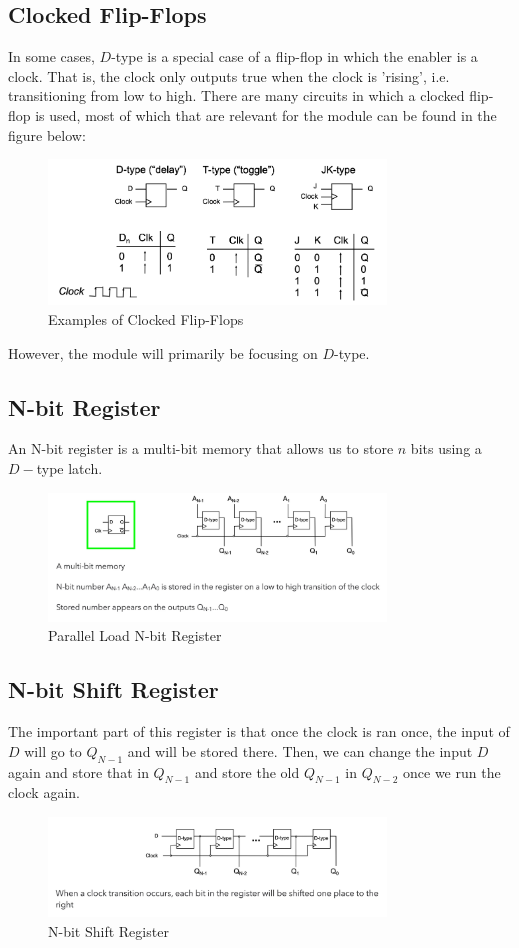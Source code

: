 \documentclass[a4paper]{article}
\theoremstyle{plain}
\theoremstyle{definition}
\theoremstyle{remark}
\begin{document}
\subsection{Clocked Flip-Flops}
In some cases, $D$-type is a special case of a flip-flop in which the enabler is a clock. That is, the clock only outputs true when the clock is 'rising', i.e. transitioning from low to high. There are many circuits in which a clocked flip-flop is used, most of which that are relevant for the module can be found in the figure below:
\begin{figure}[H]
	\centering
	\includegraphics[width=0.8\textwidth]{figures/clocked.png}
	\caption{Examples of Clocked Flip-Flops}
	\label{fig:figures-clocked-png}
\end{figure}
However, the module will primarily be focusing on $D$-type.
\subsection{N-bit Register}
An N-bit register is a multi-bit memory that allows us to store $n$ bits using a $D-$type latch. 
\begin{figure}[H]
	\centering
	\includegraphics[width=0.8\textwidth]{figures/register.png}
	\caption{Parallel Load N-bit Register}
	\label{fig:figures-register-png}
\end{figure}
\subsection{N-bit Shift Register} 
The important part of this register is that once the clock is ran once, the input of $D$ will go to $Q_{N-1}$ and will be stored there. Then, we can change the input $D$ again and store that in $Q_{N-1}$ and store the old $Q_{N-1}$ in $Q_{N-2}$ once we run the clock again. 
\begin{figure}[H]
	\centering
	\includegraphics[width=0.8\textwidth]{figures/shift.png}
	\caption{N-bit Shift Register}
	\label{fig:figures-shift-png}
\end{figure}
\end{document}

